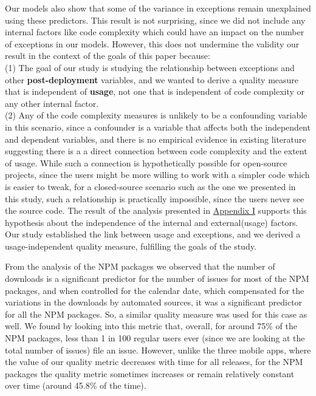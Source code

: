\documentclass[smallcondensed]{svjour3}     %
\begin{document}
Our models  also show that some of the variance in exceptions remain unexplained using these predictors.
This result is not surprising, since we did not include any internal factors
like code complexity which could have an impact on the number of exceptions in our models.
However, this does not undermine the validity our result in the context of the goals of this 
paper because: \\(1) The goal of our study is studying the relationship 
between exceptions and other \textbf{post-deployment} variables, and we wanted to
derive a quality measure that is independent of \textbf{usage}, not one that is independent of
code complexity or any other internal factor. \\
(2) Any of the code complexity measures is unlikely to be a confounding variable in this scenario,
since a confounder is a variable that affects both the independent and dependent variables, and 
there is no empirical evidence in existing literature suggesting there is a a direct connection between 
code complexity and the extent of usage. While such a connection is hypothetically possible for open-source
projects, since the users might be more willing to work with a simpler code which is easier to tweak, for a closed-source scenario such as the one we presented in this study, such a relationship is practically impossible, since the users never see the source code. The result of the analysis presented in \hyperref[app1]{Appendix I} supports this hypothesis about the independence of the internal and external(usage) factors.
Our study established the link between usage and exceptions, and we derived a 
usage-independent quality measure, fulfilling the goals of the study.

From the analysis of the NPM packages we observed that the number of downloads is a significant predictor for the number of issues for  most of the NPM packages, and when controlled for the calendar date, which compensated for the variations in the downloads by automated sources, it was a significant predictor for all the NPM packages. So, a similar quality measure was used for this case as well. 
We found by looking into this metric that, overall, for around 75\% of the NPM packages, less than 1 in 100 regular users ever (since we are looking at the total number of issues) file an issue.
However, unlike the three mobile apps, where the value of our quality metric decreases with time for all releases, for the NPM packages the quality metric sometimes increases or remain relatively constant over time (around 45.8\% of the time). 
\end{document}
